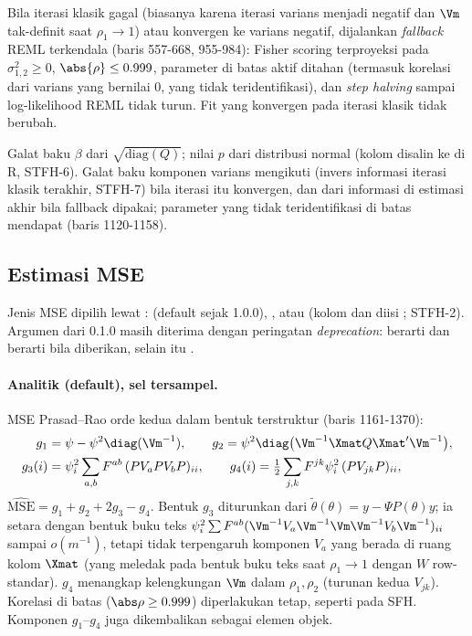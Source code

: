Bila iterasi klasik gagal (biasanya karena iterasi varians menjadi negatif
dan $\Vm$ tak-definit saat $\rho_1\to1$) atau konvergen ke varians negatif,
dijalankan \emph{fallback} REML terkendala 
(baris 557-668, 955-984): Fisher scoring terproyeksi pada $\sigma^2_{1,2}\ge0$,
$\abs{\rho}\le0.999$, parameter di batas aktif ditahan (termasuk korelasi dari
varians yang bernilai $0$, yang tidak teridentifikasi), dan \emph{step
halving} sampai log-likelihood REML tidak turun. Fit yang konvergen pada
iterasi klasik tidak berubah.

Galat baku $\beta$ dari $\sqrt{\mathrm{diag}(Q)}$; nilai $p$ dari distribusi
normal (kolom  disalin ke  di R, STFH-6). Galat
baku komponen varians mengikuti  (invers informasi
iterasi klasik terakhir, STFH-7) bila iterasi itu konvergen, dan dari
informasi di estimasi akhir bila fallback dipakai; parameter yang tidak
teridentifikasi di batas mendapat  (baris 1120-1158).

\subsection{Estimasi MSE}\label{sec:stfh-mse}

Jenis MSE dipilih lewat :  (default sejak
1.0.0), , atau  (kolom  dan 
diisi ; STFH-2). Argumen  dari 0.1.0 masih diterima
dengan peringatan \emph{deprecation}:  berarti  dan
 berarti  bila  diberikan, selain itu
.

\paragraph{Analitik (default), sel tersampel.} MSE Prasad--Rao orde kedua
\citep{marhuenda2013small} dalam bentuk terstruktur (baris 1161-1370):
\begin{align}
  g_1&=\psi-\psi^2\diag(\Vm^{-1}),\qquad
  g_2=\psi^2\diag\bigl(\Vm^{-1}\Xmat Q\Xmat'\Vm^{-1}\bigr),
  \label{eq:stfh-g12}\\
  g_3(i)&=\psi_i^2\sum_{a,b}F^{ab}\,(PV_aPV_bP)_{ii},\qquad
  g_4(i)=\tfrac12\sum_{j,k}F^{jk}\psi_i^2\,(PV_{jk}P)_{ii},
  \label{eq:stfh-g34}
\end{align}
$\widehat{\mathrm{MSE}}=g_1+g_2+2g_3-g_4$. Bentuk $g_3$ diturunkan dari
$\tilde\theta(\theta)=y-\Psi P(\theta)y$; ia setara dengan bentuk buku teks
$\psi_i^2\sum F^{ab}(\Vm^{-1}V_a\Vm^{-1}\Vm\Vm^{-1}V_b\Vm^{-1})_{ii}$ sampai
$o(m^{-1})$, tetapi tidak terpengaruh komponen $V_a$ yang berada di ruang
kolom $\Xmat$ (yang meledak pada bentuk buku teks saat $\rho_1\to1$ dengan $W$
row-standar). $g_4$ menangkap kelengkungan $\Vm$ dalam $\rho_1,\rho_2$ (turunan
kedua $V_{jk}$). Korelasi di batas ($\abs\rho\ge0.999$) diperlakukan tetap,
seperti pada SFH. Komponen $g_1$--$g_4$ juga dikembalikan sebagai elemen
objek.

